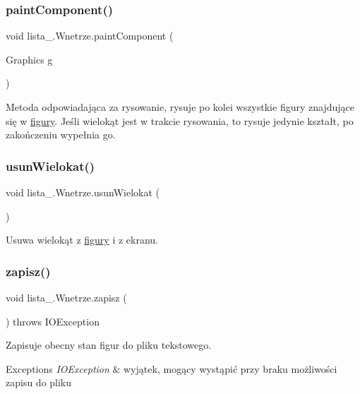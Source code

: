 \subsubsection{\texorpdfstring{paint\+Component()}{paintComponent()}}
{\footnotesize\ttfamily void lista\+\_.\+Wnetrze.\+paint\+Component (\begin{DoxyParamCaption}\item[{Graphics}]{g }\end{DoxyParamCaption})}

Metoda odpowiadająca za rysowanie, rysuje po kolei wszystkie figury znajdujące się w \mbox{\hyperlink{classlista__5_1_1_wnetrze_abeebc1924e88a0d99f63f06989b26de6}{figury}}. Jeśli wielokąt jest w trakcie rysowania, to rysuje jedynie kształt, po zakończeniu wypełnia go. \mbox{\label{classlista__5_1_1_wnetrze_aa5e96d1ba61b233b93c6d8a71931be07}} 
\subsubsection{\texorpdfstring{usun\+Wielokat()}{usunWielokat()}}
{\footnotesize\ttfamily void lista\+\_.\+Wnetrze.\+usun\+Wielokat (\begin{DoxyParamCaption}{ }\end{DoxyParamCaption})}

Usuwa wielokąt z \mbox{\hyperlink{classlista__5_1_1_wnetrze_abeebc1924e88a0d99f63f06989b26de6}{figury}} i z ekranu. \mbox{\label{classlista__5_1_1_wnetrze_a3f2f50d048d7c41f2cbbb7f91f59c077}} 
\subsubsection{\texorpdfstring{zapisz()}{zapisz()}}
{\footnotesize\ttfamily void lista\+\_.\+Wnetrze.\+zapisz (\begin{DoxyParamCaption}{ }\end{DoxyParamCaption}) throws I\+O\+Exception}

Zapisuje obecny stan figur do pliku tekstowego. 
\begin{DoxyExceptions}{Exceptions}
{\em I\+O\+Exception} & wyjątek, mogący wystąpić przy braku możliwości zapisu do pliku \\
\hline
\end{DoxyExceptions}


